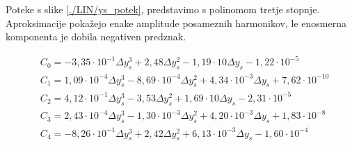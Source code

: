 Poteke s slike \ref{./LIN/ys_potek}, predstavimo s polinomom tretje stopnje. Aproksimacije pokažejo enake amplitude posameznih harmonikov, le enosmerna komponenta je dobila negativen predznak.

\begin{eqnarray}
\label{nap_lin_ys}
&C_0 =-3,35\cdot 10^{-1}\Delta y_s^{3}+2,48\Delta y_s^{2}-1,19\cdot 10\Delta y_s-1,22\cdot 10^{-5} \\                  
&C_1 =1,09\cdot 10^{-4}\Delta y_s^{3}-8,69\cdot 10^{-4}\Delta y_s^{2}+4,34\cdot 10^{-3}\Delta y_s+7,62\cdot 10^{-10} \\
&C_2 =4,12\cdot 10^{-1}\Delta y_s^{3}-3,53\Delta y_s^{2}+1,69\cdot 10\Delta y_s-2,31\cdot 10^{-5} \\                   
&C_3 =2,43\cdot 10^{-4}\Delta y_s^{3}-1,30\cdot 10^{-3}\Delta y_s^{2}+4,20\cdot 10^{-3}\Delta y_s+1,83\cdot 10^{-8} \\ 
&C_4 =-8,26\cdot 10^{-1}\Delta y_s^{3}+2,42\Delta y_s^{2}+6,13\cdot 10^{-3}\Delta y_s-1,60\cdot 10^{-4}            
\end{eqnarray}
%
%
%
%

